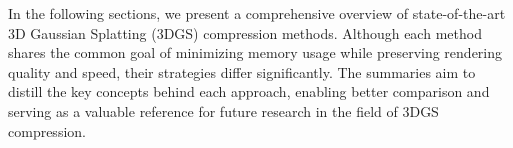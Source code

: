 In the following sections, we present a comprehensive overview of state-of-the-art 3D Gaussian Splatting (3DGS) compression methods. 
Although each method shares the common goal of minimizing memory usage while preserving rendering quality and speed, their strategies differ significantly. 
The summaries aim to distill the key concepts behind each approach, enabling better comparison and serving as a valuable reference for future research in the field of 3DGS compression.